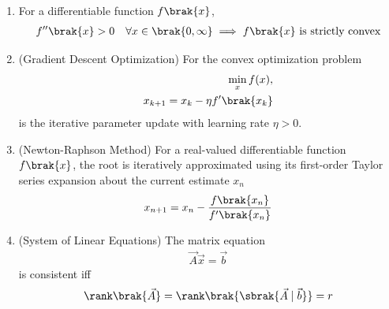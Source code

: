 \begin{enumerate}[label=\thesubsection.\arabic*, ref=\thesubsection.\theenumi,itemsep=0pt]
\item 
For a differentiable function $f\brak{x}$,
\begin{align}
f''\brak{x} > 0 \quad \forall x \in \brak{0, \infty} \implies f\brak{x} \text{ is strictly convex} \label{eq:EE26BTECH11213-convexity_check}
\end{align}
\item (Gradient Descent Optimization) For the convex optimization problem
\begin{align}
	\min_x f(x),
	\\
x_{k+1} = x_k - \eta f'\brak{x_k} \label{eq:EE26BTECH11213-grad_descent_update}
\end{align}
is the iterative parameter update with learning rate $\eta > 0$. 
\item (Newton-Raphson Method)
For a real-valued differentiable function $f\brak{x}$, the root is iteratively approximated using its first-order Taylor series expansion about the current estimate $x_n$
\begin{align}
x_{n+1} = x_n - \frac{f\brak{x_n}}{f'\brak{x_n}} 
\label{eq:EE26BTECH11213-newton_raphson}
\end{align}
\item (System of Linear Equations) 
The matrix equation
\begin{align}
\vec{A}\vec{x} = \vec{b} \label{eq:EE26BTECH11213-linear_sys}
\end{align}
    is consistent iff
    \begin{align}
    \rank\brak{\vec{A}} = \rank\brak{\sbrak{\vec{A} \mid \vec{b}}} = r \label{eq:EE26BTECH11213-consistent_rank}
    \end{align}

\end{enumerate}
